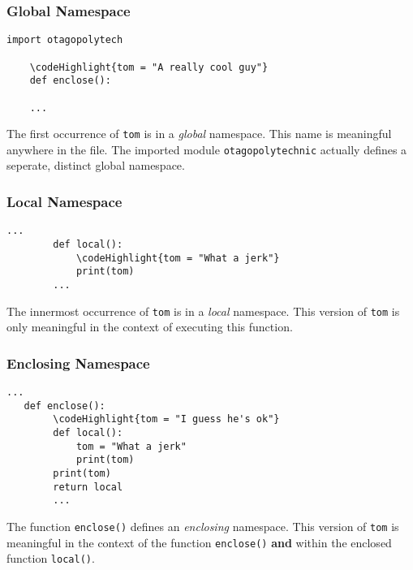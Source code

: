 \documentclass[10pt]{beamer}
\newcommand\codeHighlight[1]{\textcolor[rgb]{1,0,0}{\textbf{#1}}}
\begin{document}
\begin{frame}[fragile]
  \frametitle{Global Namespace}

  \begin{Verbatim}[commandchars=\\\{\}]
    import otagopolytech
    
    \codeHighlight{tom = "A really cool guy"}
    def enclose():
    
    ...
  \end{Verbatim}
  The first occurrence of \texttt{tom} is in a \emph{global} namespace. This
  name is meaningful anywhere in the file. The
  imported module \texttt{otagopolytechnic} actually defines a seperate, distinct
  global namespace.
  
  
\end{frame}
\begin{frame}[fragile]
  \frametitle{Local Namespace}

  \begin{Verbatim}[commandchars=\\\{\}]
        ...
        def local():
            \codeHighlight{tom = "What a jerk"}
            print(tom)
        ...    
  \end{Verbatim}
  The innermost occurrence of \texttt{tom} is in a \emph{local} namespace. This
  version of \texttt{tom} is only meaningful in the context of executing this function.  
  
\end{frame}

\begin{frame}[fragile]
  \frametitle{Enclosing Namespace}

  \begin{Verbatim}[commandchars=\\\{\}]
        ...
   def enclose():
        \codeHighlight{tom = "I guess he's ok"}    
        def local():
            tom = "What a jerk"
            print(tom)
        print(tom)
        return local  
        ...    
  \end{Verbatim}
  The function \texttt{enclose()} defines an \emph{enclosing} namespace. This
  version of \texttt{tom} is meaningful in the context of the function \texttt{enclose()}
  \textbf{and} within the enclosed function \texttt{local()}.  
\end{frame}
\end{document}
